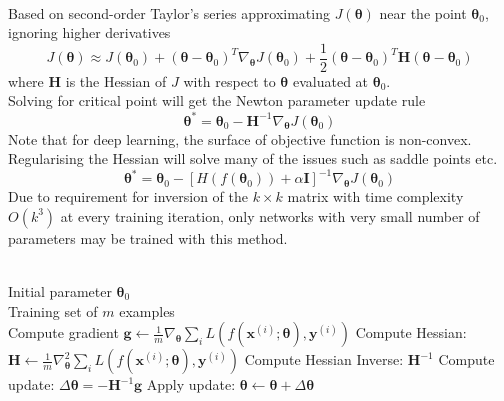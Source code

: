 \begin{remark} \\
Based on second-order Taylor's series approximating $J(\bm{\theta})$ near the point $\bm{\theta}_0$, ignoring higher derivatives
\begin{equation*}
J(\bm{\theta}) \approx J(\bm{\theta}_0) + (\bm{\theta} - \bm{\theta}_0)^T \nabla_{\bm{\theta}} J(\bm{\theta}_0) + \frac{1}{2} (\bm{\theta} - \bm{\theta}_0)^T \bm{H}(\bm{\theta} - \bm{\theta}_0) \nonumber
\end{equation*}
where $\bm{H}$ is the Hessian of $J$ with respect to $\bm{\theta}$ evaluated at $\bm{\theta}_0$.\\
Solving for critical point will get the Newton parameter update rule
\begin{equation*}
\bm{\theta}^{*} = \bm{\theta}_0 - \bm{H}^{-1} \nabla_{\bm{\theta}} J(\bm{\theta}_0) \nonumber
\end{equation*}
Note that for deep learning, the surface of objective function is non-convex. Regularising the Hessian will solve many of the issues such as saddle points etc.
\begin{equation*}
\bm{\theta}^{*} = \bm{\theta}_0 - [H(f(\bm{\theta}_0)) + \alpha \bm{I}]^{-1} \nabla_{\bm{\theta}} J(\bm{\theta}_0) \nonumber
\end{equation*}
Due to requirement for inversion of the $k \times k$ matrix with time complexity $O(k^3)$ at every training iteration, only networks with very small number of parameters may be trained with this method.
\end{remark}

\begin{breakablealgorithm}
\caption{Newton's Method with Objective $J(\bm{\theta}) = \frac{1}{m} \sum_{i=1}^m L(f(\bm{x}^{(i)}; \bm{\theta}), y^{(i)})$}
\begin{algorithmic}
\Require \\
Initial parameter $\bm{\theta}_0$\\
Training set of $m$ examples\\

\State Compute gradient $\bm{g} \leftarrow \frac{1}{m} \nabla_{\bm{\theta}} \sum_i L(f(\bm{x}^{(i)}; \bm{\theta}), \bm{y}^{(i)})$
\State Compute Hessian: $\bm{H} \leftarrow \frac{1}{m} \nabla_{\bm{\theta}}^2 \sum_i L(f(\bm{x}^{(i)}; \bm{\theta}), \bm{y}^{(i)})$
\State Compute Hessian Inverse: $\bm{H}^{-1}$
\State Compute update: $\Delta \bm{\theta} = - \bm{H}^{-1} \bm{g}$
\State Apply update: $\bm{\theta} \leftarrow \bm{\theta} + \Delta \bm{\theta}$
\EndWhile
\end{algorithmic}
\end{breakablealgorithm}

